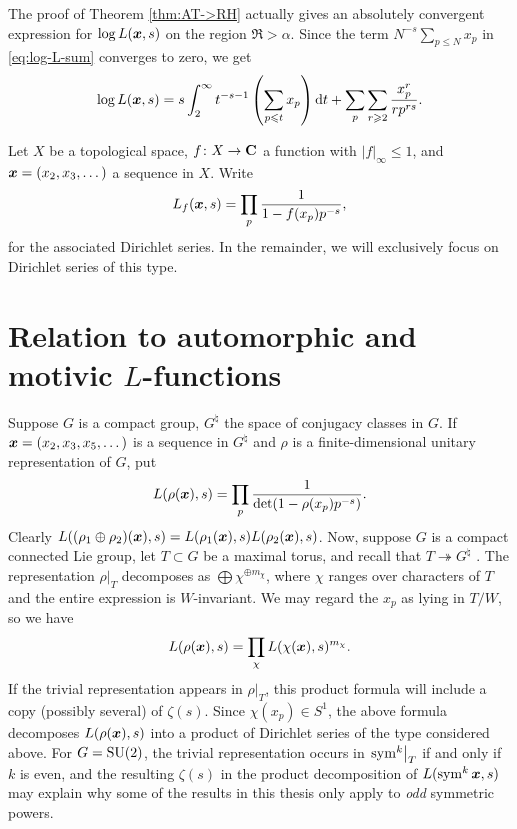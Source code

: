 The proof of Theorem \ref{thm:AT->RH} actually gives an absolutely 
convergent expression for $\log L({\boldsymbol x},s)$ on the region $\Re >\alpha$. Since 
the term $N^{-s} \sum_{p\leqslant N} x_p$ in \eqref{eq:log-L-sum} 
converges to zero, we get 
\[
	\log L({\boldsymbol x},s) = s \int_2^\infty t^{-s-1}\left(\sum_{p\leqslant t} x_p\right) \mathrm{d} t + \sum_p \sum_{r\geqslant 2} \frac{x_p^r}{r p^{r s}} . 
\]

Let $X$ be a topological space, $f\colon X\to \mathbf{C}$ a function with 
$|f|_\infty\leqslant 1$, and ${\boldsymbol x}=(x_2,x_3,\dots)$ a sequence in $X$. Write 
\[
	L_f({\boldsymbol x},s) = \prod_p \frac{1}{1-f(x_p) p^{-s}} ,
\]
for the associated Dirichlet series. In the remainder, we will 
exclusively focus on Dirichlet series of this type. 





\section{Relation to automorphic and motivic \texorpdfstring{$L$}{L}-functions}

Suppose $G$ is a compact group, $G^\natural$ the space of conjugacy classes in 
$G$. If ${\boldsymbol x} = (x_2,x_3,x_5,\dots)$ is a sequence in $G^\natural$ and $\rho$ is 
a finite-dimensional unitary representation of $G$, put 
\[
	L(\rho({\boldsymbol x}),s) = \prod_p \frac{1}{\det(1-\rho(x_p) p^{-s})} .
\]
Clearly $L((\rho_1\oplus \rho_2)({\boldsymbol x}),s) = L(\rho_1({\boldsymbol x}),s) L(\rho_2({\boldsymbol x}),s)$. 
Now, suppose $G$ is a compact connected Lie group, let $T\subset G$ be a 
maximal torus, and recall that 
$T\twoheadrightarrow G^\natural$ \cite[IX.5 Prop.~5]{bourbaki-2005}. 
The representation 
$\left.\rho\right|_T$ decomposes as $\bigoplus \chi^{\oplus m_\chi}$, where 
$\chi$ ranges over characters of $T$ and the entire expression is 
$W$-invariant. We may regard the $x_p$ as lying in $T/W$, so we have 
\[
	L(\rho({\boldsymbol x}),s) = \prod_\chi L(\chi({\boldsymbol x}),s)^{m_\chi} .
\]
If the trivial representation appears in $\left.\rho\right|_T$, this product 
formula will include a copy (possibly several) of $\zeta(s)$. Since 
$\chi(x_p) \in S^1$, the above formula decomposes $L(\rho({\boldsymbol x}),s)$ into a 
product of Dirichlet series of the type considered above. For $G = \operatorname{SU}(2)$, the 
trivial representation occurs in $\left.\operatorname{sym}^k \right|_T$ if and only if $k$ is 
even, and the resulting $\zeta(s)$ in the product decomposition of 
$L(\operatorname{sym}^k {\boldsymbol x},s)$ may explain why some of the results in this thesis only apply 
to \emph{odd} symmetric powers. 

